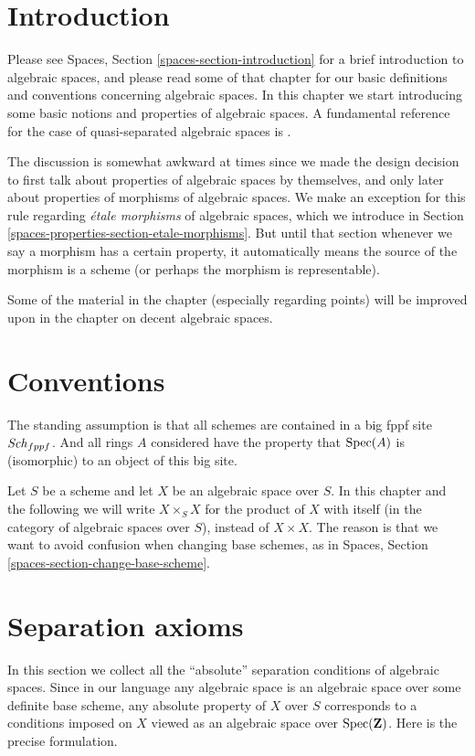 \section{Introduction}
\label{spaces-properties-section-introduction}
Please see
Spaces, Section \ref{spaces-section-introduction}
for a brief introduction to algebraic spaces, and please read
some of that chapter for our basic definitions and conventions
concerning algebraic spaces. In this chapter we start introducing
some basic notions and properties of algebraic spaces. A fundamental
reference for the case of quasi-separated algebraic spaces is
\cite{Kn}.

\medskip\noindent
The discussion is somewhat awkward at times since we made the design
decision to first talk about properties of algebraic spaces by
themselves, and only later about properties of morphisms of algebraic
spaces. We make an exception for this rule regarding
{\it \'etale morphisms} of algebraic spaces, which we introduce in
Section \ref{spaces-properties-section-etale-morphisms}.
But until that section whenever we say a morphism has a certain property, it
automatically means the source of the morphism is a scheme (or perhaps the
morphism is representable).

\medskip\noindent
Some of the material in the chapter (especially regarding points)
will be improved upon in the chapter on decent algebraic spaces.

\section{Conventions}
\label{spaces-properties-section-conventions}
The standing assumption is that all schemes are contained in
a big fppf site $\mathit{Sch}_{fppf}$. And all rings $A$ considered
have the property that $\operatorname{Spec}(A)$ is (isomorphic) to an
object of this big site.

\medskip\noindent
Let $S$ be a scheme and let $X$ be an algebraic space over $S$.
In this chapter and the following we will write $X \times_S X$
for the product of $X$ with itself (in the category of algebraic
spaces over $S$), instead of $X \times X$. The reason is that we
want to avoid confusion when changing base schemes, as in
Spaces, Section \ref{spaces-section-change-base-scheme}.

\section{Separation axioms}
\label{spaces-properties-section-separation}
In this section we collect all the ``absolute'' separation conditions
of algebraic spaces. Since in our language any algebraic space is an
algebraic space over some definite base scheme, any absolute property
of $X$ over $S$ corresponds to a conditions imposed on $X$ viewed
as an algebraic space over $\operatorname{Spec}(\mathbf{Z})$. Here is the
precise formulation.

